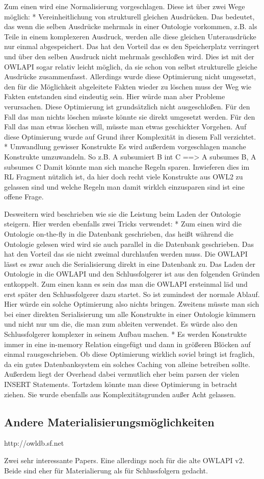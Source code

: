 Zum einen wird eine Normalisierung vorgeschlagen. Diese ist über zwei Wege möglich:
 * Vereinheitlichung von strukturell gleichen Ausdrücken.
   Das bedeutet, das wenn die selben Ausdrücke mehrmals in einer Ontologie vorkommen, z.B. als Teile in einem komplexeren Ausdruck, werden alle diese gleichen Unterausdrücke nur einmal abgespeichert. Das hat den Vorteil das es den Speicherplatz verringert und über den selben Ausdruck nicht mehrmals geschloßen wird. Dies ist mit der OWLAPI sogar relativ leicht möglich, da sie schon von selbst strukturelle gleiche Ausdrücke zusammenfasst. Allerdings wurde diese Optimierung nicht umgesetzt, den für die Möglichkeit abgeleitete Fakten wieder zu löschen muss der Weg wie Fakten entstanden sind eindeutig sein. Hier würde man aber Probleme verursachen. Diese Optimierung ist grundsätzlich nicht ausgeschloßen. Für den Fall das man nichts löschen müsste könnte sie direkt umgesetzt werden. Für den Fall das man etwas löschen will, müsste man etwas geschickter Vorgehen. Auf diese Optimierung wurde auf Grund ihrer Komplexität in diesem Fall verzichtet.
 * Umwandlung gewisser Konstrukte
   Es wird außerdem vorgeschlagen manche Konstrukte umzuwandeln. So z.B. A subsumiert B int C ==> A subsumes B, A subsumes C
   Damit könnte man sich manche Regeln sparen. Inwieferen dies im RL Fragment nützlich ist, da hier doch recht viele Konstrukte aus OWL2 zu gelassen sind und welche Regeln man damit wirklch einzusparen sind ist eine offene Frage.

Desweitern wird beschrieben wie sie die Leistung beim Laden der Ontologie steigern. Hier werden ebenfalls zwei Tricks verwendet:
 * Zum einen wird die Ontologie on-the-fly in die Datenbank geschrieben, das heißt während die Ontologie gelesen wird wird sie auch parallel in die Datenbank geschrieben. Das hat den Vorteil das sie nicht zweimal durchlaufen werden muss. Die OWLAPI lässt es zwar auch die Serialisierung direkt in eine Datenbank zu. Das Laden der Ontologie in die OWLAPI und den Schlussfolgerer ist aus den folgenden Gründen entkoppelt. Zum einen kann es sein das man die OWLAPI ersteinmal läd und erst später den Schlussfolgerer dazu startet. So ist zumindest der normale Ablauf. Hier würde ein solche Optimierung also nichts bringen. Zweitens müsste man sich bei einer direkten Serialisierung um alle Konstrukte in einer Ontologie kümmern und nicht nur um die, die man zum ableiten verwendet. Es würde also den Schlussfolgerer komplexer in seinem Aufbau machen.
 * Es werden Konstrukte immer in eine in-memory Relation eingefügt und dann in größeren Blöcken auf einmal rausgeschrieben. Ob diese Optimierung wirklich soviel bringt ist fraglich, da ein gutes Datenbanksystem ein solches Caching von alleine betreiben sollte. Außerdem liegt der Overhead dabei vermutlich eher beim parsen der vielen INSERT Statements. Tortzdem könnte man diese Optimierung in betracht ziehen. Sie wurde ebenfalls aus Komplexitätsgrunden außer Acht gelassen.

\subsection{Andere Materialisierungsmöglichkeiten}
http://owldb.sf.net

Zwei sehr interessante Papers. Eine allerdings noch für die alte OWLAPI v2. Beide sind eher für Materialierung als für Schlussfolgern gedacht.